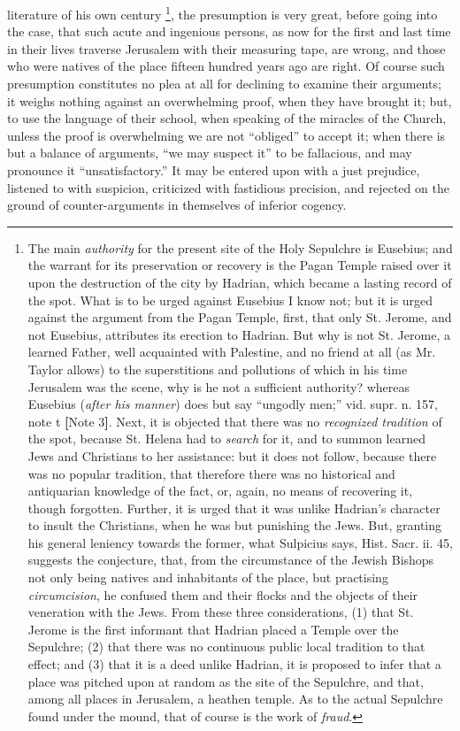 literature of his own century \footnote{The main \emph{authority} for the present site of the Holy Sepulchre
is Eusebius; and the warrant for its preservation or recovery is the
Pagan Temple raised over it upon the destruction of the city by
Hadrian, which became a lasting record of the spot. What is to be
urged against Eusebius I know not; but it is urged against the
argument from the Pagan Temple, first, that only St. Jerome, and not
Eusebius, attributes its erection to Hadrian. But why is not St.
Jerome, a learned Father, well acquainted with Palestine, and no
friend at all (as Mr. Taylor allows) to the superstitions and
pollutions of which in his time Jerusalem was the scene, why is he not
a sufficient authority? whereas Eusebius (\emph{after his manner})
does but say ``ungodly men;'' vid. supr. n. 157, note t \textbf{[}Note
3\textbf{]}. Next, it is objected that
there was no \emph{recognized tradition} of the spot, because St.
Helena had to \emph{search} for it, and to summon learned Jews and
Christians to her assistance: but it does not follow, because there
was no popular tradition, that therefore there was no historical and
antiquarian knowledge of the fact, or, again, no means of recovering
it, though forgotten. Further, it is urged that it was unlike Hadrian's
character to insult the Christians, when he was but punishing the
Jews. But, granting his general leniency towards the former, what
Sulpicius says, Hist. Sacr. ii. 45, suggests the conjecture, that,
from the circumstance of the Jewish Bishops not only being natives and
inhabitants of the place, but practising \emph{circumcision}, he
confused them and their flocks and the objects of their veneration
with the Jews. From these three considerations, (1) that St. Jerome is
the first informant that Hadrian placed a Temple over the Sepulchre;
(2) that there was no continuous public local tradition to that
effect; and (3) that it is a deed unlike Hadrian, it is proposed to
infer that a place was pitched upon at random as the site of the
Sepulchre, and that, among all places in Jerusalem, a heathen temple.
As to the actual Sepulchre found under the mound, that of course is
the work of \emph{fraud}.}, the presumption is very great, before going into the
case, that such acute and ingenious persons, as now for the first and
last time in their lives traverse Jerusalem with their measuring tape,
are wrong, and those who were natives of the place fifteen hundred
years ago are right. Of course such presumption constitutes no plea at
all for declining to examine their arguments; it weighs nothing
against an overwhelming proof, when they have brought it; but, to use
the language of their school, when speaking of the miracles of the
Church, unless the proof is overwhelming we are not ``obliged'' to
accept it; when there is but a balance of arguments, ``we may suspect
it'' to be fallacious, and may pronounce it ``unsatisfactory.'' It
may be entered upon with a just prejudice, listened to with suspicion,
criticized with fastidious precision, and rejected on the ground of
counter-arguments in themselves of inferior cogency.

